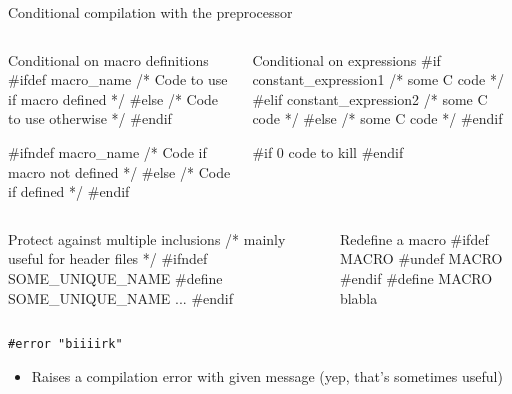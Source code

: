\begin{frame}[fragile]{Conditional compilation with the preprocessor}
  \begin{columns}
\begin{column}{.45\linewidth}
  \begin{boitecode}{Conditional on macro definitions}
#ifdef macro_name
  /* Code to use if macro defined */
#else
  /* Code to use otherwise */
#endif

#if\alert{n}def macro_name
  /* Code if macro not defined */
#else
  /* Code if defined */
#endif
  \end{boitecode}      
    \end{column}
    \begin{column}{.45\linewidth}
  \begin{boitecode}{Conditional on expressions}
#if constant_expression1
  /* some C code */
#elif constant_expression2
  /* some C code */
#else
  /* some C code */
#endif

#if 0
  code to kill
#endif
  \end{boitecode}      
\end{column}
  \end{columns}

  \begin{columns}
    \begin{column}{.45\linewidth}
      \begin{boitecode}{Protect against multiple inclusions}
/* mainly useful for header files */
#ifndef SOME_UNIQUE_NAME
#define SOME_UNIQUE_NAME        
   ... 
#endif
      \end{boitecode}
    \end{column}
    \begin{column}{.45\linewidth}

      \begin{boitecode}{Redefine a macro}
#ifdef MACRO
#undef MACRO
#endif
#define MACRO blabla        
      \end{boitecode}
    \end{column}
  \end{columns}
  
  \begin{block}{\texttt{\#error "biiiirk"}}
    \begin{itemize}\vspace{-.5\baselineskip}
    \item Raises a compilation error with given message (yep, that's sometimes
      useful)
    \end{itemize}
  \end{block}
\end{frame}


